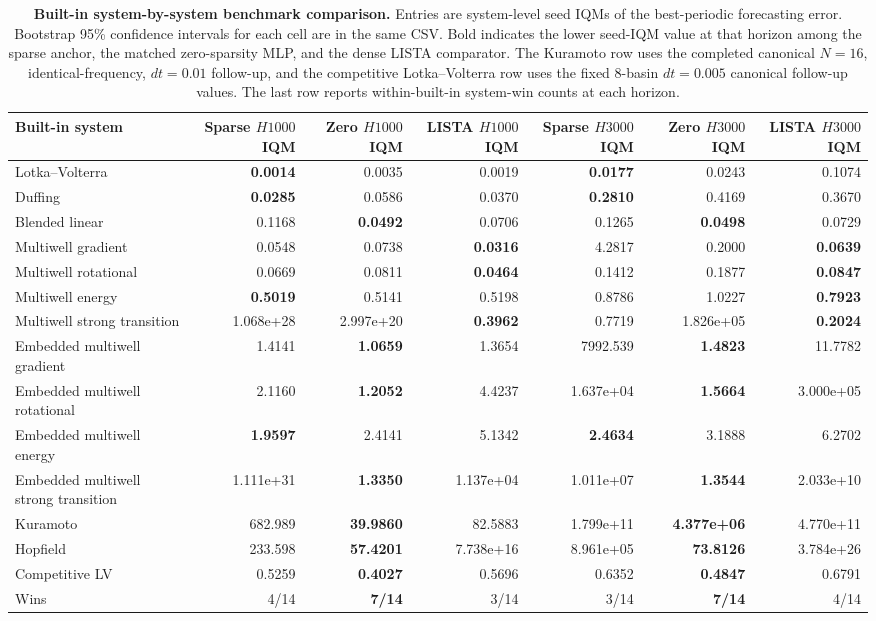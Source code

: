 \begin{table}[ht]
\centering
\scriptsize
\setlength{\tabcolsep}{4pt}
\begin{tabular}{p{}rrrrrr}
\toprule
Built-in system & Sparse $H1000$ IQM & Zero $H1000$ IQM & LISTA $H1000$ IQM & Sparse $H3000$ IQM & Zero $H3000$ IQM & LISTA $H3000$ IQM \\
\midrule
Lotka--Volterra & \textbf{0.0014} & 0.0035 & 0.0019 & \textbf{0.0177} & 0.0243 & 0.1074 \\
Duffing & \textbf{0.0285} & 0.0586 & 0.0370 & \textbf{0.2810} & 0.4169 & 0.3670 \\
Blended linear & 0.1168 & \textbf{0.0492} & 0.0706 & 0.1265 & \textbf{0.0498} & 0.0729 \\
Multiwell gradient & 0.0548 & 0.0738 & \textbf{0.0316} & 4.2817 & 0.2000 & \textbf{0.0639} \\
Multiwell rotational & 0.0669 & 0.0811 & \textbf{0.0464} & 0.1412 & 0.1877 & \textbf{0.0847} \\
Multiwell energy & \textbf{0.5019} & 0.5141 & 0.5198 & 0.8786 & 1.0227 & \textbf{0.7923} \\
Multiwell strong transition & 1.068e+28 & 2.997e+20 & \textbf{0.3962} & 0.7719 & 1.826e+05 & \textbf{0.2024} \\
Embedded multiwell gradient & 1.4141 & \textbf{1.0659} & 1.3654 & 7992.539 & \textbf{1.4823} & 11.7782 \\
Embedded multiwell rotational & 2.1160 & \textbf{1.2052} & 4.4237 & 1.637e+04 & \textbf{1.5664} & 3.000e+05 \\
Embedded multiwell energy & \textbf{1.9597} & 2.4141 & 5.1342 & \textbf{2.4634} & 3.1888 & 6.2702 \\
Embedded multiwell strong transition & 1.111e+31 & \textbf{1.3350} & 1.137e+04 & 1.011e+07 & \textbf{1.3544} & 2.033e+10 \\
Kuramoto & 682.989 & \textbf{39.9860} & 82.5883 & 1.799e+11 & \textbf{4.377e+06} & 4.770e+11 \\
Hopfield & 233.598 & \textbf{57.4201} & 7.738e+16 & 8.961e+05 & \textbf{73.8126} & 3.784e+26 \\
Competitive LV & 0.5259 & \textbf{0.4027} & 0.5696 & 0.6352 & \textbf{0.4847} & 0.6791 \\
\midrule
Wins & 4/14 & \textbf{7/14} & 3/14 & 3/14 & \textbf{7/14} & 4/14 \\
\bottomrule
\end{tabular}
\caption{\textbf{Built-in system-by-system benchmark comparison.} Entries are system-level seed IQMs of the best-periodic forecasting error.
Bootstrap 95\% confidence intervals for each cell are in the same CSV. Bold indicates the lower seed-IQM value at that horizon among the sparse anchor, the matched zero-sparsity MLP, and the dense LISTA comparator. The Kuramoto row uses the completed canonical $N=16$, identical-frequency, $dt=0.01$ follow-up, and the competitive Lotka--Volterra row uses the fixed 8-basin $dt=0.005$ canonical follow-up values. The last row reports within-built-in system-win counts at each horizon.}
\label{tab:review-cross-system-builtin-20260314}
\end{table}

